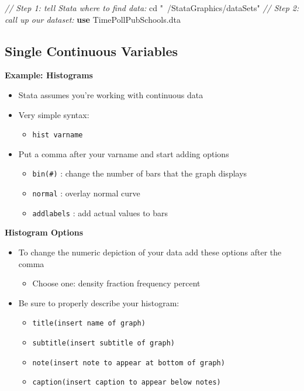 \documentclass[]{book}
\newenvironment{Shaded}{\begin{snugshade}}{\end{snugshade}}
\newcommand{\CommentTok}[1]{\textcolor[rgb]{0.56,0.35,0.01}{\textit{#1}}}
\newcommand{\KeywordTok}[1]{\textcolor[rgb]{0.13,0.29,0.53}{\textbf{#1}}}
\newcommand{\NormalTok}[1]{#1}
\newcommand{\StringTok}[1]{\textcolor[rgb]{0.31,0.60,0.02}{#1}}
\providecommand{\tightlist}{%
  \setlength{\itemsep}{0pt}\setlength{\parskip}{0pt}}
\begin{document}
\begin{Shaded}
\begin{Highlighting}[]
  \CommentTok{// Step 1: tell Stata where to find data:}
\NormalTok{  cd }\StringTok{"~/StataGraphics/dataSets"}
  \CommentTok{// Step 2: call up our dataset:}
  \KeywordTok{use}\NormalTok{ TimePollPubSchools.dta}
\end{Highlighting}
\end{Shaded}

\hypertarget{single-continuous-variables}{%
\subsection{Single Continuous Variables}\label{single-continuous-variables}}

\textbf{Example: Histograms}

\begin{itemize}
\tightlist
\item
  Stata assumes you're working with continuous data
\item
  Very simple syntax:

  \begin{itemize}
  \tightlist
  \item
    \texttt{hist\ varname}
  \end{itemize}
\item
  Put a comma after your varname and start adding options

  \begin{itemize}
  \tightlist
  \item
    \texttt{bin(\#)} : change the number of bars that the graph displays
  \item
    \texttt{normal} : overlay normal curve
  \item
    \texttt{addlabels} : add actual values to bars
  \end{itemize}
\end{itemize}

\textbf{Histogram Options}

\begin{itemize}
\tightlist
\item
  To change the numeric depiction of your data add these options after the comma

  \begin{itemize}
  \tightlist
  \item
    Choose one: density fraction frequency percent
  \end{itemize}
\item
  Be sure to properly describe your histogram:

  \begin{itemize}
  \tightlist
  \item
    \texttt{title(insert\ name\ of\ graph)}
  \item
    \texttt{subtitle(insert\ subtitle\ of\ graph)}
  \item
    \texttt{note(insert\ note\ to\ appear\ at\ bottom\ of\ graph)}
  \item
    \texttt{caption(insert\ caption\ to\ appear\ below\ notes)}
  \end{itemize}
\end{itemize}
\end{document}
